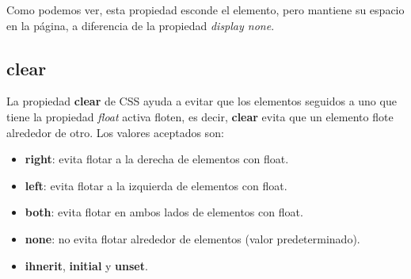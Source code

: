 Como podemos ver, esta propiedad esconde el elemento, pero mantiene su espacio en la página, a diferencia de la propiedad \textit{display none}.


\subsection{clear}

La propiedad \textbf{clear} de CSS ayuda a evitar que los elementos seguidos a uno que tiene la propiedad \textit{float} activa floten, es decir, \textbf{clear} evita que un elemento flote alrededor de otro. Los valores aceptados son:
\begin{itemize}
    \item \textbf{right}: evita flotar a la derecha de elementos con float.
    \item \textbf{left}: evita flotar a la izquierda de elementos con float.
    \item \textbf{both}: evita flotar en ambos lados de elementos con float.
    \item \textbf{none}: no evita flotar alrededor de elementos (valor predeterminado).
    \item \textbf{ihnerit}, \textbf{initial} y \textbf{unset}.
\end{itemize}

